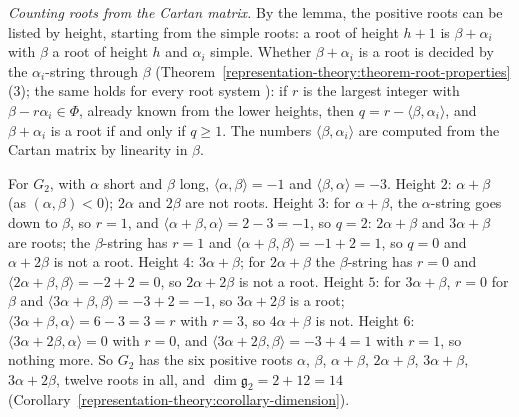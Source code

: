 \begin{example}\label{representation-theory:example-counting-roots}
\emph{Counting roots from the Cartan matrix.} By the lemma, the positive roots can be listed by height, starting from the simple roots: a root of height $h + 1$ is $\beta + \alpha_i$ with $\beta$ a
root of height $h$ and $\alpha_i$ simple. Whether $\beta + \alpha_i$ is a root is decided by the $\alpha_i$-string through $\beta$
(Theorem~\ref{representation-theory:theorem-root-properties}(3); the same holds for every root system \cite[Section 9.4]{humphreys-lie}): if $r$ is the largest integer with
$\beta - r\alpha_i \in \Phi$, already known from the lower heights, then $q = r - \langle\beta, \alpha_i\rangle$, and $\beta + \alpha_i$ is a root if and only if $q \geq 1$. The numbers
$\langle\beta, \alpha_i\rangle$ are computed from the Cartan matrix by linearity in $\beta$.

For $G_2$, with $\alpha$ short and $\beta$ long, $\langle\alpha, \beta\rangle = -1$ and $\langle\beta, \alpha\rangle = -3$. Height $2$: $\alpha + \beta$ (as $(\alpha, \beta) < 0$); $2\alpha$ and
$2\beta$ are not roots. Height $3$: for $\alpha + \beta$, the $\alpha$-string goes down to $\beta$, so $r = 1$, and $\langle\alpha + \beta, \alpha\rangle = 2 - 3 = -1$, so $q = 2$: $2\alpha + \beta$
and $3\alpha + \beta$ are roots; the $\beta$-string has $r = 1$ and $\langle\alpha + \beta, \beta\rangle = -1 + 2 = 1$, so $q = 0$ and $\alpha + 2\beta$ is not a root. Height $4$: $3\alpha + \beta$; for $2\alpha + \beta$ the $\beta$-string has $r = 0$ and
$\langle 2\alpha + \beta, \beta\rangle = -2 + 2 = 0$, so $2\alpha + 2\beta$ is not a root.
Height $5$: for $3\alpha + \beta$, $r = 0$ for $\beta$ and $\langle 3\alpha + \beta, \beta\rangle = -3 + 2 = -1$, so $3\alpha + 2\beta$ is a root; $\langle 3\alpha + \beta, \alpha\rangle = 6 - 3 = 3 = r$
with $r = 3$, so $4\alpha + \beta$ is not. Height $6$: $\langle 3\alpha + 2\beta, \alpha\rangle = 0$ with $r = 0$, and $\langle 3\alpha + 2\beta, \beta\rangle = -3 + 4 = 1$ with $r = 1$, so nothing
more. So $G_2$ has the six positive roots $\alpha$, $\beta$, $\alpha + \beta$, $2\alpha + \beta$, $3\alpha + \beta$, $3\alpha + 2\beta$, twelve roots in all, and $\dim\mathfrak{g}_2 = 2 + 12 = 14$
(Corollary~\ref{representation-theory:corollary-dimension}).


\end{example}
